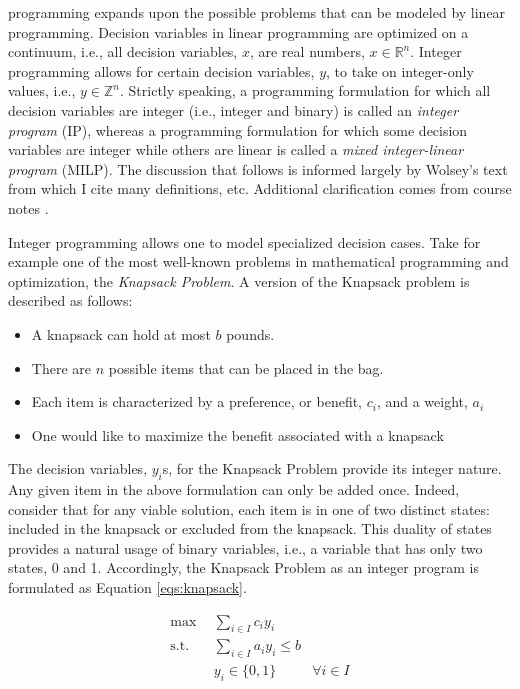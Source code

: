 \Integer programming expands upon the possible problems that can be modeled by
linear programming. Decision variables in linear programming are optimized on a
continuum, i.e., all decision variables, $x$, are real numbers,
$x \in \mathbb{R}^n$. Integer programming allows for certain decision variables,
$y$, to take on integer-only values, i.e., $y \in \mathbb{Z}^n$. Strictly
speaking, a programming formulation for which all decision variables are integer
(i.e., integer and binary) is called an \textit{integer program} (IP), whereas a
programming formulation for which some decision variables are integer while
others are linear is called a \textit{mixed integer-linear program} (MILP). The
discussion that follows is informed largely by Wolsey's
text \cite{wolsey_integer_1998} from which I cite many definitions,
etc. Additional clarification comes from course notes \cite{luedtke_class_2010}.

Integer programming allows one to model specialized decision cases. Take for
example one of the most well-known problems in mathematical programming and
optimization, the \textit{Knapsack Problem}. A version of the Knapsack problem
is described as follows:

\begin{itemize}
        \item A knapsack can hold at most $b$ pounds. 
        \item There are $n$ possible items that can be placed in the bag.
        \item Each item is characterized by a preference, or benefit, $c_i$, 
              and a weight, $a_i$
        \item One would like to maximize the benefit associated with a knapsack
\end{itemize}

The decision variables, $y_i$s, for the Knapsack Problem provide its integer
nature. Any given item in the above formulation can only be added once. Indeed,
consider that for any viable solution, each item is in one of two distinct
states: included in the knapsack or excluded from the knapsack. This duality of
states provides a natural usage of binary variables, i.e., a variable that has
only two states, 0 and 1. Accordingly, the Knapsack Problem as an integer
program is formulated as Equation \ref{eqs:knapsack}.

\begin{subequations}\label{eqs:knapsack}
  \begin{align}
    \max \:\: & 
    \sum_{i \in I} c_i y_i
    & \\
    \text{s.t.} \:\: &
    \sum_{i \in I} a_i y_i \leq b 
    & \\
    &
    y_i \in \{ 0, 1 \}
    &
    \forall i \in I
  \end{align}
\end{subequations}


